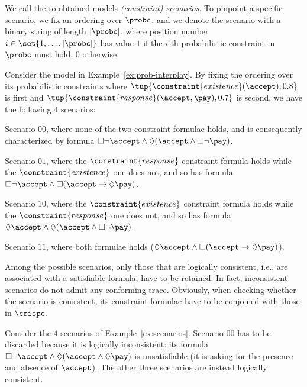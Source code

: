We call the so-obtained \declare models \emph{(constraint) scenarios}. To pinpoint a specific scenario, we fix an ordering over $\probc$, and we denote the scenario with a binary string of length $|\probc|$, where position number $i \in \set{1,\ldots,|\probc|}$ has value $1$ if the $i$-th probabilistic constraint in $\probc$ must hold, $0$ otherwise.

\begin{example}
  \label{ex:scenarios}
  Consider the \pdeclare model in Example~\ref{ex:prob-interplay}. By fixing the ordering over its probabilistic constraints where $\tup{\constraint{existence}(\accept),0.8}$ is first and $\tup{\constraint{response}(\accept,\pay),0.7}$ is second, we have the following $4$ scenarios:
  \begin{compactenum}
  \item Scenario $00$, where none of the two constraint formulae holds, and is consequently characterized by formula
  $\Box \neg \accept \land \Diamond (\accept \land \Box \neg \pay)$.
    \item Scenario $01$, where the $\constraint{response}$ constraint formula holds while the $\constraint{existence}$ one does not, and so has formula
  $\Box \neg \accept \land \Box (\accept \rightarrow \Diamond \pay)$.
    \item Scenario $10$, where the $\constraint{existence}$ constraint formula holds while the $\constraint{response}$ one does not, and so has formula
  $\Diamond \accept \land \Diamond (\accept \land \Box \neg \pay)$.
     \item Scenario $11$, where both formulae holds ($\Diamond \accept \land \Box (\accept \rightarrow \Diamond \pay)$).
  \end{compactenum}
\end{example}

Among the possible scenarios, only those that are logically consistent, i.e., are associated with a satisfiable formula, have to be retained. In fact, inconsistent scenarios do not admit any conforming trace. Obviously, when checking whether the scenario is consistent, its constraint formulae have to be conjoined with those in  $\crispc$.

\begin{example}
\label{ex:consistent-scenarios}
Consider the $4$ scenarios of Example~\ref{ex:scenarios}. Scenario $00$ has to be discarded because it is logically inconsistent: its formula $\Box \neg \accept \land \Diamond (\accept \land \Diamond \pay)$ is unsatisfiable (it is asking for the presence and absence of $\accept$). The other three scenarios are instead logically consistent.
\end{example}

